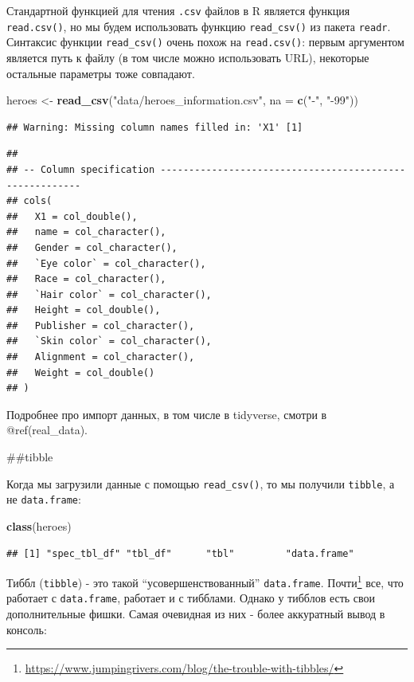 \documentclass[
]{book}
\newenvironment{Shaded}{\begin{snugshade}}{\end{snugshade}}
\newcommand{\DataTypeTok}[1]{\textcolor[rgb]{0.13,0.29,0.53}{#1}}
\newcommand{\KeywordTok}[1]{\textcolor[rgb]{0.13,0.29,0.53}{\textbf{#1}}}
\newcommand{\NormalTok}[1]{#1}
\newcommand{\StringTok}[1]{\textcolor[rgb]{0.31,0.60,0.02}{#1}}
\renewcommand{\href}[2]{#2\footnote{\url{#1}}}
\begin{document}
Стандартной функцией для чтения \texttt{.csv} файлов в R является функция \texttt{read.csv()}, но мы будем использовать функцию \texttt{read\_csv()} из пакета \texttt{readr}. Синтаксис функции \texttt{read\_csv()} очень похож на \texttt{read.csv()}: первым аргументом является путь к файлу (в том числе можно использовать URL), некоторые остальные параметры тоже совпадают.

\begin{Shaded}
\begin{Highlighting}[]
\NormalTok{heroes <-}\StringTok{ }\KeywordTok{read_csv}\NormalTok{(}\StringTok{"data/heroes_information.csv"}\NormalTok{,}
                   \DataTypeTok{na =} \KeywordTok{c}\NormalTok{(}\StringTok{"-"}\NormalTok{, }\StringTok{"-99"}\NormalTok{))}
\end{Highlighting}
\end{Shaded}

\begin{verbatim}
## Warning: Missing column names filled in: 'X1' [1]
\end{verbatim}

\begin{verbatim}
## 
## -- Column specification --------------------------------------------------------
## cols(
##   X1 = col_double(),
##   name = col_character(),
##   Gender = col_character(),
##   `Eye color` = col_character(),
##   Race = col_character(),
##   `Hair color` = col_character(),
##   Height = col_double(),
##   Publisher = col_character(),
##   `Skin color` = col_character(),
##   Alignment = col_character(),
##   Weight = col_double()
## )
\end{verbatim}

Подробнее про импорт данных, в том числе в tidyverse, смотри в @ref(real\_data).

\#\#tibble

Когда мы загрузили данные с помощью \texttt{read\_csv()}, то мы получили \texttt{tibble}, а не \texttt{data.frame}:

\begin{Shaded}
\begin{Highlighting}[]
\KeywordTok{class}\NormalTok{(heroes)}
\end{Highlighting}
\end{Shaded}

\begin{verbatim}
## [1] "spec_tbl_df" "tbl_df"      "tbl"         "data.frame"
\end{verbatim}

Тиббл (\texttt{tibble}) - это такой ``усовершенствованный'' \texttt{data.frame}. \href{https://www.jumpingrivers.com/blog/the-trouble-with-tibbles/}{Почти} все, что работает с \texttt{data.frame}, работает и с тибблами. Однако у тибблов есть свои дополнительные фишки. Самая очевидная из них - более аккуратный вывод в консоль:
\end{document}
